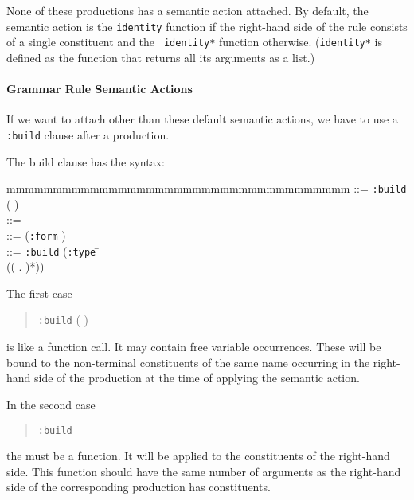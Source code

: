 None of these productions has a semantic action attached.  By default,
the semantic action is the {\tt identity} function if the right-hand
side of the rule consists of a single constituent and the {\tt
identity*} function otherwise.  ({\tt identity*} is defined as the
function that returns all its arguments as a list.)

\paragraph{Grammar Rule Semantic Actions}

If we want to attach other than these default semantic actions, we have to
use a {\tt :build} clause after a production. 

The build clause has the syntax:

\begin{tabbing}
mmmmmmmmmmmmmmmmmmmmmmmmmmmmmmmmmmmmm\kill
  ::= \={\tt :build} ( )\\
  ::=  \\
  ::=  ({\tt :form} )\\
  ::= \={\tt :build} (\={\tt :type} \= \\
                            \>                \> (( . )*))
\end{tabbing}

The first case 
\begin{quote}
 {\tt :build} ( )
\end{quote}

is like a function call.  It may contain free variable occurrences.
These will be bound to the non-terminal constituents of the same name
occurring in the right-hand side of the production at the time of
applying the semantic action.

In the second case
\begin{quote}
        {\tt :build} 
\end{quote}

the  must be a function.  It will be applied to the
constituents of the right-hand side.  This function should have the same
number of arguments as the right-hand side of the corresponding
production has constituents.

